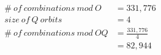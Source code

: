 \documentclass[preview, border=2mm]{standalone}
\begin{document}
\vspace*{\fill}

{\fontsize{32pt}{40pt}\selectfont
	\begin{align*}
		\#\ of\ combinations\ mod\ O &= 331{,}776 \\
		size\ of\ Q\ orbits &= 4 \\
		\#\ of\ combinations\ mod\ OQ &= \frac{331{,}776}{4} \\
			&= 82{,}944
	\end{align*}
}

\vspace*{\fill}
\end{document}
